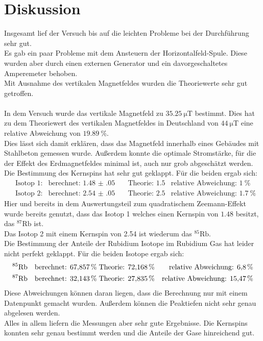 \newpage
\section{Diskussion}

	Insgesamt lief der Versuch bis auf die leichten Probleme bei der Durchführung sehr gut.\\
	Es gab ein paar Probleme mit dem Ansteuern der Horizontalfeld-Spule. Diese wurden aber durch einen externen Generator und ein davorgeschaltetes Amperemeter behoben.\\
	Mit Ausnahme des vertikalen Magnetfeldes wurden die Theoriewerte sehr gut getroffen.\\\\
	In dem Versuch wurde das vertikale Magnetfeld zu $\SI{35.25}{\micro\tesla}$ bestimmt. Dies hat zu dem Theoriewert\cite{Erdmag} des vertikalen Magnetfeldes in Deutschland von $\SI{44}{\micro\tesla}$ eine relative Abweichung von $\SI{19.89}{\percent}$.\\
	Dies lässt sich damit erklären, dass das Magnetfeld innerhalb eines Gebäudes mit Stahlbeton gemessen wurde.
	Außerdem konnte die optimale Stromstärke, für die der Effekt des Erdmagnetfeldes minimal ist, auch nur grob abgeschätzt werden.\\
	Die Bestimmung des Kernspins hat sehr gut geklappt. Für die beiden  ergab sich:
	\begin{align*}
		&\text{Isotop 1:} & \text{berechnet: }\num{1.48(05)}\quad &\text{Theorie: }\num{1.5} &\text{relative Abweichung: }\SI{1}{\percent}  \\
		&\text{Isotop 2:} & \text{berechnet: }\num{2.54(05)}\quad &\text{Theorie: }\num{2.5} &\text{relative Abweichung: }\SI{1.7}{\percent}
	\end{align*}
	Hier und bereits in dem Auswertungsteil zum quadratischem Zeemann-Effekt wurde bereits genutzt, dass das Isotop 1 welches einen Kernspin von $\num{1.48}$ besitzt, das $^{87}\text{Rb}$ ist. \\
	Das Isotop 2 mit einem Kernspin von \num{2.54} ist wiederum das $^{85}{\text{Rb}}$.\\
	Die Bestimmung der Anteile der Rubidium Isotope im Rubidium Gas\cite{Rubidium} hat leider nicht perfekt geklappt. 
	Für die beiden Isotope ergab sich:
	\begin{align*}
		&^{85}\text{Rb} & \text{berechnet: }\SI{67.857}{\percent} &\text{\;Theorie: }\SI{72.168}{\percent} &\text{relative Abweichung: }\SI{6.8}{\percent} \\
		&^{87}\text{Rb} & \text{berechnet: }\SI{32.143}{\percent} &\text{\;Theorie: }\SI{27.835}{\percent} &\text{relative Abweichung: }\SI{15.47}{\percent} 
	\end{align*}
	Diese Abweichungen können daran liegen, dass die Berechnung nur mit einem Datenpunkt gemacht wurden. Außerdem können die Peaktiefen nicht sehr genau abgelesen werden.\\
	Alles in allem liefern die Messungen aber sehr gute Ergebnisse. Die Kernspins konnten sehr genau bestimmt werden und die Anteile der Gase hinreichend gut. 
	\newpage

